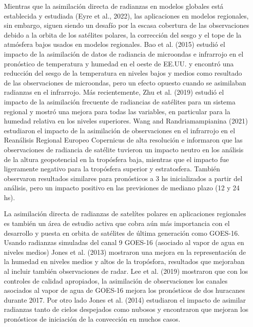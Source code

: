 \documentclass[12pt,oneside]{reedthesis}
\begin{document}
Mientras que la asimilación directa de radianzas en modelos globales está establecida y estudiada (Eyre et al., 2022), las aplicaciones en modelos regionales, sin embargo, siguen siendo un desafío por la escasa cobertura de las observaciones debido a la orbita de los satélites polares, la corrección del sesgo y el tope de la atmósfera bajos usados en modelos regionales. Bao et al. (2015) estudió el impacto de la asimilación de datos de radiancia de microondas e infrarrojo en el pronóstico de temperatura y humedad en el oeste de EE.UU. y encontró una reducción del sesgo de la temperatura en niveles bajos y medios como resultado de las observaciones de microondas, pero un efecto opuesto cuando se asimilaban radianzas en el infrarrojo. Más recientemente, Zhu et al. (2019) estudió el impacto de la asimilación frecuente de radiancias de satélites para un sistema regional y mostró una mejora para todas las variables, en particular para la humedad relativa en los niveles superiores. Wang and Randriamampianina (2021) estudiaron el impacto de la asimilación de observaciones en el infrarrojo en el Reanálisis Regional Europeo Copernicus de alta resolución e informaron que las observaciones de radiancia de satélite tuvieron un impacto neutro en los análisis de la altura geopotencial en la tropósfera baja, mientras que el impacto fue ligeramente negativo para la tropósfera superior y estratosfera. También observaron resultados similares para pronósticos a 3 hs inicializados a partir del análisis, pero un impacto positivo en las previsiones de mediano plazo (12 y 24 hs).

La asimilación directa de radianzas de satelítes polares en aplicaciones regionales es también un área de estudio activa que cobra aún más importancia con el desarrollo y puesta en orbita de satélites de última generación como GOES-16. Usando radianzas simuladas del canal 9 GOES-16 (asociado al vapor de agua en niveles medios) Jones et al. (2013) mostraron una mejora en la representación de la humedad en niveles medios y altos de la tropósfora, resultados que mejoraban al incluir también observaciones de radar. Lee et al. (2019) mostraron que con los controles de calidad apropiados, la asimilación de observaciones los canales asociados al vapor de agua de GOES-16 mejora los pronósticos de dos huracanes durante 2017. Por otro lado Jones et al. (2014) estudiaron el impacto de asimilar radianzas tanto de cielos despejados como nubosos y encontraron que mejoran los pronósticos de iniciación de la convección en muchos casos.
\end{document}
